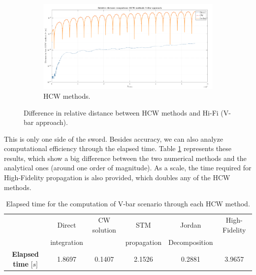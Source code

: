 		\begin{figure}[!htb]
		\centering
		\ContinuedFloat
		\begin{subfigure}[t]{\linewidth}
		\begin{changemargin}{-1.3cm}{-1cm}
		\begin{adjustbox}{width=1.1\textwidth}
		\centering\includegraphics[width = \linewidth]{Chapters/Chapter_02/dr_comp_HCW_V_bar_approach}
		\end{adjustbox}
		\end{changemargin}
		\caption{HCW methods.}
		\label{figCh2:dr_comp_HCW_V_bar_approach}
		\end{subfigure}
		\caption{Difference in relative distance between HCW methods and Hi-Fi (V-bar approach).}
		\end{figure}
		\FloatBarrier
		\indent This is only one side of the sword. Besides accuracy, we can also analyze computational efficiency through the elapsed time. Table \ref{tabCh2:HCW_Vbar} represents these results, which show a big difference between the two numerical methods and the analytical ones (around one order of magnitude). As a scale, the time required for High-Fidelity propagation is also provided, which doubles any of the HCW methods.
		\begin{table}[!htb]
		\centering
		\begin{tabular}{|c|c|c|c|c|c|}
		\hline 
		\rowcolor{Gray!10}
		 													& Direct 		& CW solution 		& STM 			& Jordan  			& High-Fidelity \\ 
		\rowcolor{Gray!10} 
		\multirow{-2}{*}{\textbf{Method}}					& integration 	&   				& propagation 	&  Decomposition 	&  \\ 
		\hline 
		\cellcolor{Gray!10} {\textbf{Elapsed time} [$s$]} 	& 1.8697 & 0.1407 & 2.1526 & 0.2881 & 3.9657 \\ 
		\hline 
		\end{tabular} 
		\caption{Elapsed time for the computation of V-bar scenario through each HCW method.}
		\label{tabCh2:HCW_Vbar}
		\end{table}
